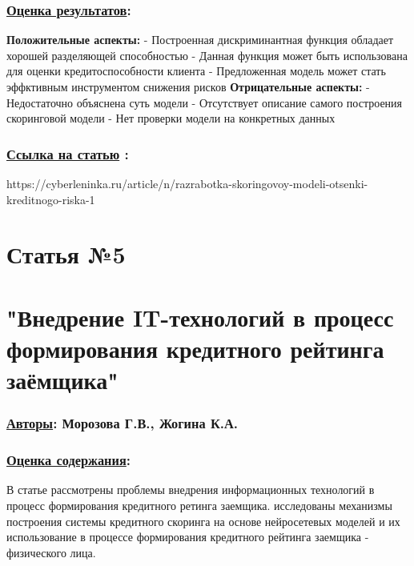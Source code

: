 \documentclass[a4paper,14pt]{article}
\begin{document}
\subsubsection*{\underline{Оценка результатов}:}
\textbf{Положительные аспекты:} \newline
- Построенная дискриминантная функция обладает хорошей разделяющей способностью \newline
- Данная функция может быть использована для оценки кредитоспособности клиента \newline
- Предложенная модель может стать эффктивным инструментом снижения рисков \vspace{10pt} \newline
\textbf{Отрицательные аспекты:} \newline
- Недостаточно объяснена суть модели \newline
- Отсутствует описание самого построения скоринговой модели \newline
- Нет проверки модели на конкретных данных \newline
\subsubsection*{\underline{Ссылка на статью} :}
https://cyberleninka.ru/article/n/razrabotka-skoringovoy-modeli-otsenki-kreditnogo-riska-1





\newpage
\section*{Статья №5}
\section*{"Внедрение IT-технологий в процесс формирования кредитного рейтинга заёмщика"}
\subsubsection*{\underline {Авторы}: Морозова Г.В., Жогина К.А.}
\subsubsection*{\underline{Оценка содержания}:}
В статье рассмотрены проблемы внедрения информационных технологий в процесс формирования кредитного ретинга заемщика. исследованы механизмы построения системы кредитного скоринга на основе нейросетевых моделей и их использование в процессе формирования кредитного рейтинга заемщика - физического лица.
\end{document}
